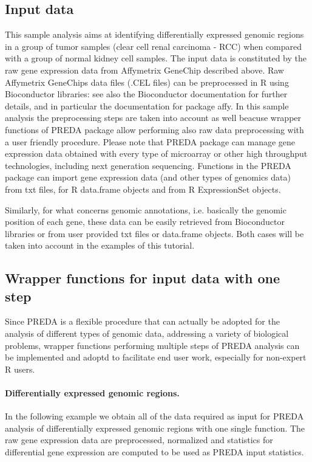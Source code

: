 \documentclass[a4paper,10pt]{article}
\begin{document}
\subsection{Input data}
This sample analysis aims at identifying differentially expressed genomic regions in a group of tumor samples (clear cell renal carcinoma - RCC) when compared with a group of normal kidney cell samples. The input data is constituted by the raw gene expression data from Affymetrix GeneChip described above. Raw Affymetrix GeneChips data files (.CEL files) can be preprocessed in R using Bioconductor libraries: see also the Bioconductor documentation for further details, and in particular the documentation for package affy. In this sample analysis the preprocessing steps are taken into account as well beacuse wrapper functions of PREDA package allow performing also raw data preprocessing with a user friendly procedure. Please note that PREDA package can manage gene expression data obtained with every type of microarray or other high throughput technologies, including next generation sequencing. Functions in the PREDA package can import gene expression data (and other types of genomics data) from txt files, for R data.frame objects and from R ExpressionSet objects.

Similarly, for what concerns genomic annotations, i.e. basically the genomic position of each gene, these data can be easily retrieved from Bioconductor libraries or from user provided txt files or data.frame objects. Both cases will be taken into account in the examples of this tutorial.



\subsection{Wrapper functions for input data with one step}
Since PREDA is a flexible procedure that can actually be adopted for the analysis of different types of genomic data, addressing a variety of biological problems, wrapper functions performing multiple steps of PREDA analysis can be implemented and adoptd to facilitate end user work, especially for non-expert R users.

\paragraph{Differentially expressed genomic regions.} In the following example we obtain all of the data required as input for PREDA analysis of differentially expressed genomic regions with one single function. The raw gene expression data are preprocessed, normalized and statistics for differential gene expression are computed to be used as PREDA input statistics.
\end{document}
